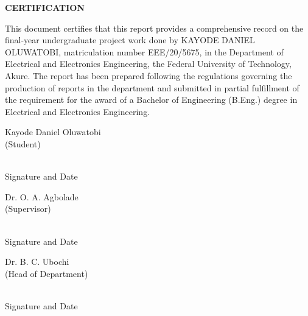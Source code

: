\documentclass[12pt, a4paper]{report}
\begin{document}
\begin{center}
  {\fontsize{14}{16}\bfseries CERTIFICATION}
\end{center}

\vspace{10pt}

This document certifies that this report provides a comprehensive record
on the final-year undergraduate project work done by KAYODE DANIEL
OLUWATOBI, matriculation number EEE/20/5675, in the Department of
Electrical and Electronics Engineering, the Federal University of
Technology, Akure. The report has been prepared following the regulations
governing the production of reports in the department and submitted in
partial fulfillment of the requirement for the award of a Bachelor of
Engineering (B.Eng.) degree in Electrical and Electronics Engineering.

\vspace{60pt}

\noindent
\begin{minipage}[t]{0.45\textwidth}
  Kayode Daniel Oluwatobi\\[2pt]
  (Student)
\end{minipage}
\hfill
\begin{minipage}[t]{0.45\textwidth}
  \dotfill\\[2pt]
  \centering Signature and Date
\end{minipage}

\vspace{90pt}

\noindent
\begin{minipage}[t]{0.45\textwidth}
  Dr. O. A. Agbolade\\[2pt]
  (Supervisor)
\end{minipage}
\hfill
\begin{minipage}[t]{0.45\textwidth}
  \dotfill\\[2pt]
  \centering Signature and Date
\end{minipage}

\vspace{90pt}

\noindent
\begin{minipage}[t]{0.45\textwidth}
  Dr. B. C. Ubochi\\[2pt]
  (Head of Department)
\end{minipage}
\hfill
\begin{minipage}[t]{0.45\textwidth}
  \dotfill\\[2pt]
  \centering Signature and Date
\end{minipage}
\end{document}

